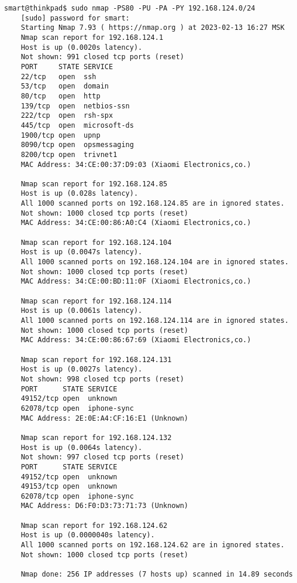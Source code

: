 \begin{Verbatim}[frame=single]
    smart@thinkpad$ sudo nmap -PS80 -PU -PA -PY 192.168.124.0/24
    [sudo] password for smart: 
    Starting Nmap 7.93 ( https://nmap.org ) at 2023-02-13 16:27 MSK
    Nmap scan report for 192.168.124.1
    Host is up (0.0020s latency).
    Not shown: 991 closed tcp ports (reset)
    PORT     STATE SERVICE
    22/tcp   open  ssh
    53/tcp   open  domain
    80/tcp   open  http
    139/tcp  open  netbios-ssn
    222/tcp  open  rsh-spx
    445/tcp  open  microsoft-ds
    1900/tcp open  upnp
    8090/tcp open  opsmessaging
    8200/tcp open  trivnet1
    MAC Address: 34:CE:00:37:D9:03 (Xiaomi Electronics,co.)

    Nmap scan report for 192.168.124.85
    Host is up (0.028s latency).
    All 1000 scanned ports on 192.168.124.85 are in ignored states.
    Not shown: 1000 closed tcp ports (reset)
    MAC Address: 34:CE:00:86:A0:C4 (Xiaomi Electronics,co.)

    Nmap scan report for 192.168.124.104
    Host is up (0.0047s latency).
    All 1000 scanned ports on 192.168.124.104 are in ignored states.
    Not shown: 1000 closed tcp ports (reset)
    MAC Address: 34:CE:00:BD:11:0F (Xiaomi Electronics,co.)

    Nmap scan report for 192.168.124.114
    Host is up (0.0061s latency).
    All 1000 scanned ports on 192.168.124.114 are in ignored states.
    Not shown: 1000 closed tcp ports (reset)
    MAC Address: 34:CE:00:86:67:69 (Xiaomi Electronics,co.)

    Nmap scan report for 192.168.124.131
    Host is up (0.0027s latency).
    Not shown: 998 closed tcp ports (reset)
    PORT      STATE SERVICE
    49152/tcp open  unknown
    62078/tcp open  iphone-sync
    MAC Address: 2E:0E:A4:CF:16:E1 (Unknown)

    Nmap scan report for 192.168.124.132
    Host is up (0.0064s latency).
    Not shown: 997 closed tcp ports (reset)
    PORT      STATE SERVICE
    49152/tcp open  unknown
    49153/tcp open  unknown
    62078/tcp open  iphone-sync
    MAC Address: D6:F0:D3:73:71:73 (Unknown)

    Nmap scan report for 192.168.124.62
    Host is up (0.0000040s latency).
    All 1000 scanned ports on 192.168.124.62 are in ignored states.
    Not shown: 1000 closed tcp ports (reset)

    Nmap done: 256 IP addresses (7 hosts up) scanned in 14.89 seconds
\end{Verbatim}

